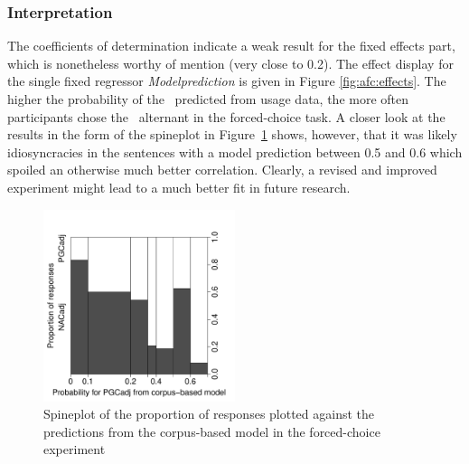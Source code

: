\subsubsection{Interpretation}

The coefficients of determination indicate a weak result for the fixed effects part, which is nonetheless worthy of mention (very close to 0.2).
The effect display for the single fixed regressor \textit{Modelprediction} is given in Figure \ref{fig:afc:effects}.
The higher the probability of the \PGCa\ predicted from usage data, the more often participants chose the \PGCa\ alternant in the forced-choice task.
A closer look at the results in the form of the spineplot in Figure~\ref{fig:spines} shows, however, that it was likely idiosyncracies in the sentences with a model prediction between 0.5 and 0.6 which spoiled an otherwise much better correlation.
Clearly, a revised and improved experiment might lead to a much better fit in future research.

\begin{figure}[htbp!]
  \centering
  \includegraphics[width=0.5\textwidth]{../R/output/fc_proportions}
  \caption{Spineplot of the proportion of responses plotted against the predictions from the corpus-based model in the forced-choice experiment}
  \label{fig:spines}
\end{figure}

